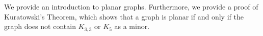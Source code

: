 


We provide an introduction to planar graphs. Furthermore, we provide a proof of Kuratowski's Theorem, which shows that a graph is planar if and only if the graph does not contain $K_{3,3}$ or $K_5$ as a minor.
